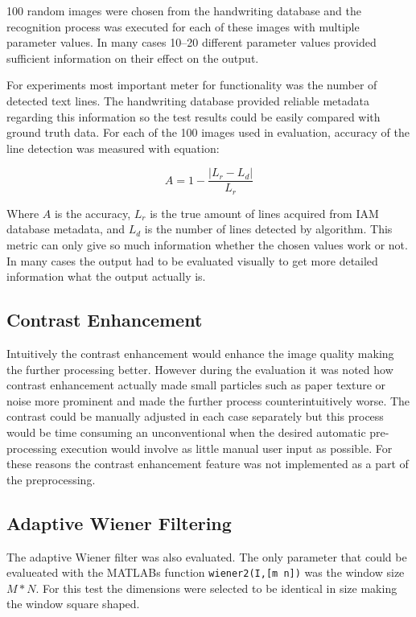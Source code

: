 \documentclass{article}
\def\code#1{\texttt{#1}}
\begin{document}
    100 random images were chosen from the handwriting database and the recognition process was executed for each of these images with multiple parameter values. In many cases 10--20 different parameter values provided sufficient information on their effect on the output.

    For experiments most important meter for functionality was the number of detected text lines. The handwriting database provided reliable metadata regarding this information so the test results could be easily compared with ground truth data. For each of the 100 images used in evaluation, accuracy of the line detection was measured with equation:

    \begin{equation}
      A = 1-\frac{|L_r-L_d|}{L_r}
    \end{equation}

    Where $A$ is the accuracy, $L_r$ is the true amount of lines acquired from IAM database metadata, and $L_d$ is the number of lines detected by algorithm. This metric can only give so much information whether the chosen values work or not. In many cases the output had to be evaluated visually to get more detailed information what the output actually is.


  \subsection{Contrast Enhancement}
    Intuitively the contrast enhancement would enhance the image quality making the further processing better. However during the evaluation it was noted how contrast enhancement actually made small particles such as paper texture or noise more prominent and made the further process counterintuitively worse. The contrast could be manually adjusted in each case separately but this process would be time consuming an unconventional when the desired automatic pre-processing execution would involve as little manual user input as possible. For these reasons the contrast enhancement feature was not implemented as a part of the preprocessing.

  \subsection{Adaptive Wiener Filtering}
    The adaptive Wiener filter was also evaluated. The only parameter that could be evalueated with the MATLABs function \code{wiener2(I,[m n])} was the window size $M * N$. For this test the dimensions were selected to be identical in size making the window square shaped.
\end{document}
